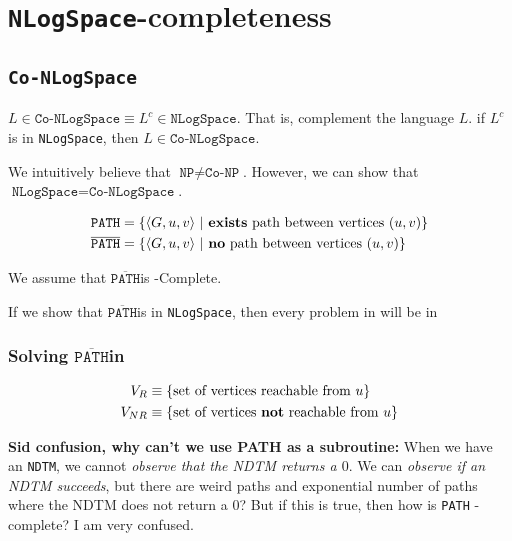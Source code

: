 \newcommand{\ppoly}{$\texttt{P}^{\text{poly}}$}
\newcommand{\pathbar}{$\overline{\texttt{PATH}}$}
\newcommand{\problempath}{\texttt{PATH}}
\chapter{\texttt{NLogSpace}-completeness}

\section{\texttt{Co-NLogSpace}}
$L \in \texttt{Co-NLogSpace} \equiv L^c \in \texttt{NLogSpace}$.
That is, complement the language $L$. if $L^c$ is in \texttt{NLogSpace},
then $L \in \texttt{Co-NLogSpace}$.

We intuitively believe that $\texttt{NP} \neq \texttt{Co-NP}$. However, we can
show that $\texttt{NLogSpace} = \texttt{Co-NLogSpace}$.

\begin{align*}
\texttt{PATH} &= \{ \langle G, u, v \rangle~\vert~\text{\textbf{exists} path between vertices $(u, v)$} \} \\
\overline{\texttt{PATH}} &=  \{ \langle G, u, v \rangle~\vert~\text{\textbf{no} path between vertices $(u, v)$} \}
\end{align*}

We assume that \pathbar is \conlogspace-Complete.

If we show that \pathbar is in \texttt{NLogSpace}, then every problem
in \conlogspace will be in \nlogspace

\subsection{Solving \pathbar in \nlogspace}
\begin{align*}
V_R &\equiv \{ \text{set of vertices reachable from $u$} \} \\
V_{NR} &\equiv \{ \text{set of vertices \textbf{not} reachable from $u$} \} \\
\end{align*}

\textbf{Sid confusion, why can't we use PATH as a subroutine:}
When we have an \texttt{NDTM}, we cannot \textit{observe that the NDTM returns a $0$}.
We can \textit{observe if an NDTM succeeds}, but there are weird paths and exponential
number of paths where the NDTM does not return a $0$? But if this is true,
then how is \texttt{PATH} \nlogspace-complete? I am very confused.

